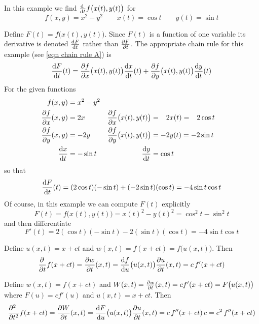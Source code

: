 \begin{eg}\label{eg:chainRuleA}
In this example we find $\diff{}{t}f\big(x(t),y(t)\big)$
for 
\begin{equation*}
f(x,y)=x^2-y^2\qquad x(t)=\cos t \qquad y(t)=\sin t
\end{equation*}

Define $F(t)=f\big(x(t),y(t)\big)$. Since $F(t)$ is a function of one
variable its derivative is denoted $\diff{F}{t}$ rather than $\pdiff{F}{t}$.
The appropriate chain rule for this example (see \eqref{eqn chain rule A}) 
is
$$
\diff{F}{t}(t)=
  \pdiff{f}{x}\big(x(t),y(t)\big) \diff{x}{t}(t)
  +\pdiff{f}{y}\big(x(t),y(t)\big) \diff{y}{t}(t)
$$
For the given functions
\begin{align*}
f(x,y)&=x^2-y^2  \\
\pdiff{f}{x}(x,y)&= 2x  &
\pdiff{f}{x}\big(x(t),y(t)\big)&= \phantom{-}2x(t) =\phantom{-}2\cos t  \\
\pdiff{f}{y}(x,y)&= -2y  &
\pdiff{f}{y}\big(x(t),y(t)\big)&= -2y(t)  =-2\sin t \\
\diff{x}{t}&=-\sin t &
\diff{y}{t}&=\cos t  
\end{align*}
so that 
$$
\diff{F}{t}(t)=(2\cos t)(-\sin t) +(-2\sin t)(\cos t) = -4\sin t\cos t
$$
Of course, in this example we can compute $F(t)$ explicitly
$$
F(t)=f\big(x(t),y(t)\big)=x(t)^2-y(t)^2=\cos^2t-\sin^2t
$$
and then differentiate
$$
F'(t)=2(\cos t)(-\sin t)-2(\sin t)(\cos t) = -4 \sin t\cos t
$$
\end{eg}


\begin{eg}[$\pdiff{}{t}f(x+ct)$]\label{eg:chainRuleB}
 Define
$u(x,t)=x+ct$ and $w(x,t)=f(x+ct)=f\big(u(x,t)\big)$. Then
$$
\pdiff{}{t}f(x+ct)
=\pdiff{w}{t}(x,t)
=\diff{f}{u}\big(u(x,t)\big)  \pdiff{u}{t}(x,t)
=c\, f'(x+ct)
$$
\end{eg}

\goodbreak
\begin{eg}\label{eg:chainRuleC}
 Define  $w(x,t)=f(x+ct)$ and 
$W(x,t)=\pdiff{w}{t}(x,t)=cf'(x+ct)=F\big(u(x,t)\big)$ 
where $F(u)=cf'(u)$ and $u(x,t)=x+ct$. Then
$$
\frac{\partial^2\hfill}{\partial t^2}f(x+ct)
=\pdiff{W}{t}(x,t)
=\diff{F}{u}\big(u(x,t)\big)  \pdiff{u}{t}(x,t)
=c\,f''(x+ct)\,c
=c^2\,f''(x+ct)
$$
\end{eg}

